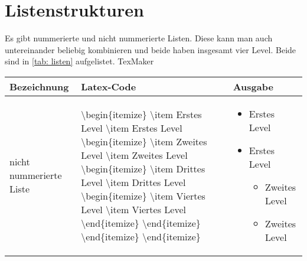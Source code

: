 \section{Listenstrukturen}%
Es gibt nummerierte und nicht nummerierte Listen. Diese kann man auch untereinander beliebig kombinieren und beide haben insgesamt vier Level. Beide sind in \ref{tab: listen} aufgelistet. TexMaker \\%
\begin{table}[h]%
\begin{tabu} to \textwidth {X[l]X[l]X[l]}%
\toprule%
\textbf{Bezeichnung} 		& \textbf{Latex-Code} 			& \textbf{Ausgabe}\\%
\midrule%
nicht\newline
nummerierte\newline
Liste			 	& \textbackslash begin\{itemize\}\newline
					\textbackslash item Erstes Level\newline
					\textbackslash item Erstes Level\newline
					\textbackslash begin\{itemize\}\newline
					\textbackslash item Zweites Level\newline
					\textbackslash item Zweites Level\newline
					\textbackslash begin\{itemize\}\newline
					\textbackslash item Drittes Level\newline
					\textbackslash item Drittes Level\newline
					\textbackslash begin\{itemize\}\newline
					\textbackslash item Viertes Level\newline
					\textbackslash item Viertes Level\newline
					\textbackslash end\{itemize\}\newline
					\textbackslash end\{itemize\}\newline
					\textbackslash end\{itemize\}\newline
					\textbackslash end\{itemize\}				& \begin{itemize}
																\item Erstes Level
																\item Erstes Level
																\begin{itemize}
																	\item Zweites Level
																	\item Zweites Level
																	\begin{itemize}

\end{itemize}
\end{itemize}
\end{itemize}
\end{tabu}
\end{table}
